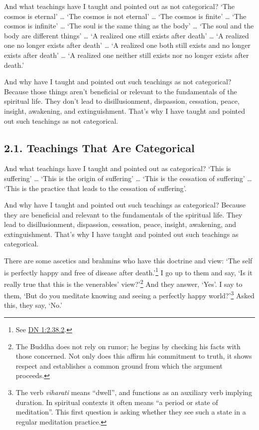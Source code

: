\documentclass[12pt,openany]{book}%
\begin{document}
And what teachings have I taught and pointed out as not categorical? ‘The cosmos is eternal’ … ‘The cosmos is not eternal’ … ‘The cosmos is finite’ … ‘The cosmos is infinite’ … ‘The soul is the same thing as the body’ … ‘The soul and the body are different things’ … ‘A realized one still exists after death’ … ‘A realized one no longer exists after death’ … ‘A realized one both still exists and no longer exists after death’ … ‘A realized one neither still exists nor no longer exists after death.’ 

And why have I taught and pointed out such teachings as not categorical? Because those things aren’t beneficial or relevant to the fundamentals of the spiritual life. They don’t lead to disillusionment, dispassion, cessation, peace, insight, awakening, and extinguishment. That’s why I have taught and pointed out such teachings as not categorical. 

\subsection*{2.1. Teachings That Are Categorical }

And what teachings have I taught and pointed out as categorical? ‘This is suffering’ … ‘This is the origin of suffering’ … ‘This is the cessation of suffering’ … ‘This is the practice that leads to the cessation of suffering’. 

And why have I taught and pointed out such teachings as categorical? Because they are beneficial and relevant to the fundamentals of the spiritual life. They lead to disillusionment, dispassion, cessation, peace, insight, awakening, and extinguishment. That’s why I have taught and pointed out such teachings as categorical. 

There are some ascetics and brahmins who have this doctrine and view: ‘The self is perfectly happy and free of disease after death.’\footnote{See \href{https://suttacentral.net/dn1/en/sujato\#2.38.2}{DN 1:2.38.2}. } I go up to them and say, ‘Is it really true that this is the venerables’ view?’\footnote{The Buddha does not rely on rumor; he begins by checking his facts with those concerned. Not only does this affirm his commitment to truth, it shows respect and establishes a common ground from which the argument proceeds. } And they answer, ‘Yes’. I say to them, ‘But do you meditate knowing and seeing a perfectly happy world?’\footnote{The verb \textit{viharati} means “dwell”, and functions as an auxiliary verb implying duration. In spiritual contexts it often means “a period or state of meditation”. This first question is asking whether they see such a state in a regular meditation practice. } Asked this, they say, ‘No.’ 
\end{document}

